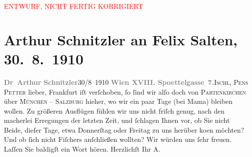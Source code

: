 
\begin{center}
            \textcolor{red}{ENTWURF, NICHT FERTIG KORRIGIERT}
                      \end{center}
            
         
         \renewcommand{\erwaehntePersonen}{Personen: Samuel Fischer, Hedwig Fischer, Felix Salten, Ottilie Salten, Louise Schnitzler}
         \renewcommand{\erwaehnteOrte}{Orte: Bad Ischl, Edmund-Weiß-Gasse, Frankfurt am Main, Hotel und Pension Rudolfshöhe (Leopold Petter), München, Partenkirchen, Salzburg, Unterach am Attersee}
         \renewcommand{\erwaehnteWerke}{}
               \section[Arthur Schnitzler an Felix Salten, 30. 8. 1910]{ Arthur Schnitzler an Felix Salten, 30. 8. 1910}\nopagebreak{}\rehead{ }\begin{ledgroupsized}[t]{13cm}\normalsize\beginnumbering \toendnotes[C]{\smallbreak\pagebreak[2]} 
\toendnotes[C]{\smallbreak}\pstart
           \noindent{}{\pb}\textcolor{gray}{\textbf{Dr Arthur Schnitzler}}\hfill 30/8 1910\pend
           \pstart
           \textcolor{gray}{\textbf{Wien XVIII.
                           Spoettelgasse 7.}}\hfill \textsc{Ischl, Pens Petter}\pend
           \pstart
           lieber, Frankfurt iſt verſchoben, ſo ſind wir alſo doch
               von \textsc{Partenkirchen} über \textsc{München} – \textsc{Salzburg} hieher, wo wir ein paar Tage (bei Mama) bleiben wollen. Zu größeren Ausflügen fühlen wir uns
               nicht friſch genug, nach den macherlei Erregungen der letzten Zeit, und ſchlagen
               Ihnen vor, {\pb}ob Sie nicht Beide, dieſer Tage, etwa Donnerſtag oder
               Freitag zu uns herüber ko{\geminationm}en möchten? Und ob ſich nicht
                  Fiſchers anſchließen wollten? Wir
               würden uns ſehr freuen. Laſſen Sie baldigſt ein Wort hören. \pend
           \pstart Herzlichſt Ihr \spacefill\mbox{A.}\pend{}
         

\end{ledgroupsized}
